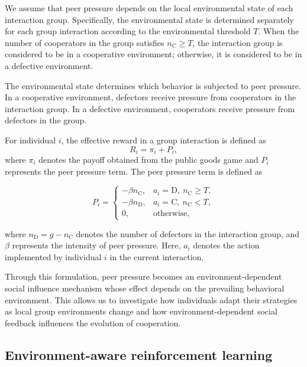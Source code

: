 \documentclass[%
  aip,
  amsmath,amssymb,
  reprint,
  showkeys,
]{revtex4-1}
\begin{document}
We assume that peer pressure depends on the local environmental state of each interaction group. Specifically, the environmental state is determined separately for each group interaction according to the environmental threshold $T$. When the number of cooperators in the group satisfies $n_\mathrm{C}\geq T$, the interaction group is considered to be in a cooperative environment; otherwise, it is considered to be in a defective environment.

The environmental state determines which behavior is subjected to peer pressure. In a cooperative environment, defectors receive pressure from cooperators in the interaction group. In a defective environment, cooperators receive pressure from defectors in the group.

For individual $i$, the effective reward in a group interaction is defined as
\begin{equation}
R_i=\pi_i+P_i,
\label{eq:effective}
\end{equation}
where $\pi_i$ denotes the payoff obtained from the public goods game and $P_i$ represents the peer pressure term. The peer pressure term is defined as

\begin{equation}
P_i=
\begin{cases}
-\beta n_\mathrm{C}, & a_i=\mathrm{D},\ n_\mathrm{C}\geq T,\\
-\beta n_\mathrm{D}, & a_i=\mathrm{C},\ n_\mathrm{C}<T,\\
0, & \text{otherwise},
\end{cases}
\label{eq:pressure}
\end{equation}

where $n_\mathrm{D}=g-n_\mathrm{C}$ denotes the number of defectors in the interaction group, and $\beta$ represents the intensity of peer pressure. Here, $a_i$ denotes the action implemented by individual $i$ in the current interaction.

Through this formulation, peer pressure becomes an environment-dependent social influence mechanism whose effect depends on the prevailing behavioral environment. 
This allows us to investigate how individuals adapt their strategies as local group environments change and how environment-dependent social feedback influences the evolution of cooperation.


\subsection{Environment-aware reinforcement learning}
\end{document}
